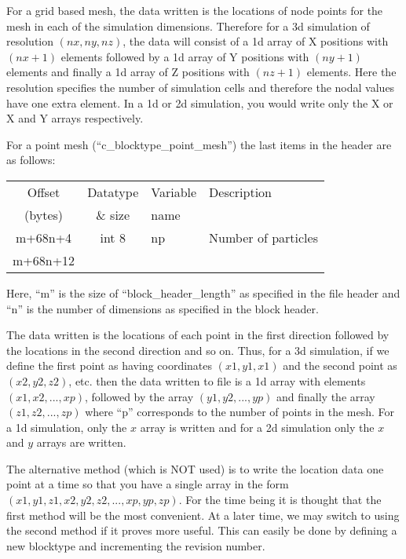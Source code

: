 \documentclass[12pt]{article}
\begin{document}
For a grid based mesh, the data written is the locations of node points for
the mesh in each of the simulation dimensions. Therefore for a
3d simulation of resolution $(nx,ny,nz)$, the data will consist of 
a 1d array of X positions with $(nx+1)$ elements followed by a 1d array of
Y positions with $(ny+1)$ elements and finally a 1d array of Z positions with
$(nz+1)$ elements. Here the resolution specifies the number of simulation cells
and therefore the nodal values have one extra element. In a 1d or 2d simulation,
you would write only the X or X and Y arrays respectively.

For a point mesh (``c\_blocktype\_point\_mesh'') the last items in the header
are as follows:\\

\begin{center}
\begin{tabularx}{0.9\textwidth}[!hbt]{cclX}
  Offset & Datatype & Variable & Description\\
  (bytes) & \& size & name &
  \\\toprule

  m+68n+4 & int 8 & np & Number of particles
  \\\midrule

  m+68n+12 &
\end{tabularx}
\end{center}\vspace{10pt}

Here, ``m'' is the size of ``block\_header\_length'' as specified in the file
header and ``n'' is the number of dimensions as specified in the block header.

The data written is the locations of each point in the first direction followed
by the locations in the second direction and so on.
Thus, for a 3d simulation, if we define the first point as having coordinates
$(x1,y1,x1)$ and the second point as $(x2,y2,z2)$, etc. then the data written
to file is a 1d array with elements $(x1,x2, ... ,xp)$, followed by the array
$(y1,y2, ... ,yp)$ and finally the array $(z1,z2, ... ,zp)$ where
``p'' corresponds to the number of points in the mesh. For a 1d simulation,
only the $x$ array is written and for a 2d simulation only the $x$ and $y$
arrays are written.

The alternative method (which is NOT used) is to write the location data
one point at a time so that you have a single array in the form
$(x1,y1,z1,x2,y2,z2, ... ,xp,yp,zp)$. For the time being it is thought that
the first method will be the most convenient. At a later time, we may switch
to using the second method if it proves more useful. This can easily be done
by defining a new blocktype and incrementing the revision number.
\end{document}
